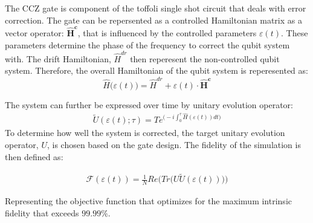 The CCZ gate is component of the toffoli single shot circuit that deals with error correction. The gate can be repersented as a controlled Hamiltonian matrix as a vector operator: $\mathbf{\hat{H}^c}$, that is influenced by the controlled parameters $\varepsilon (t)$. These parameters determine the phase of the frequency to correct the qubit system with. The drift Hamiltonian, $\hat{H}^{dr}$ then reperesent the non-controlled qubit system. Therefore, the overall Hamiltonian of the qubit system
is reperesented as: 
\begin{equation*}
\hat{H} \big( \varepsilon (t) \big) = \hat{H}^{dr} + \varepsilon (t) \cdot  \mathbf{\hat{H}^c}
\end{equation*}

The system can further be expressed over time by unitary evolution operator:
\vspace{0.15cm}
\begin{align*}
  \tilde{U}(\varepsilon(t);\tau) = T e^{\Big( -i \int_{0}^{\tau} \hat{H}(\varepsilon(t))dt \Big) } 
\end{align*}
To determine how well the system is corrected, the target unitary evolution operator, $U$, is chosen based on the gate design. The fidelity of the simulation is then defined as:
\begin{center}
\begin{align*}
  \mathscr{F} (\varepsilon(t)) = \frac{1}{N} Re \Big(Tr \big(U\tilde{U}(\varepsilon(t))\big) \Big)
\end{align*}
\end{center}
Representing the objective function that optimizes for the maximum intrinsic fidelity that exceeds $99.99\%$. 


